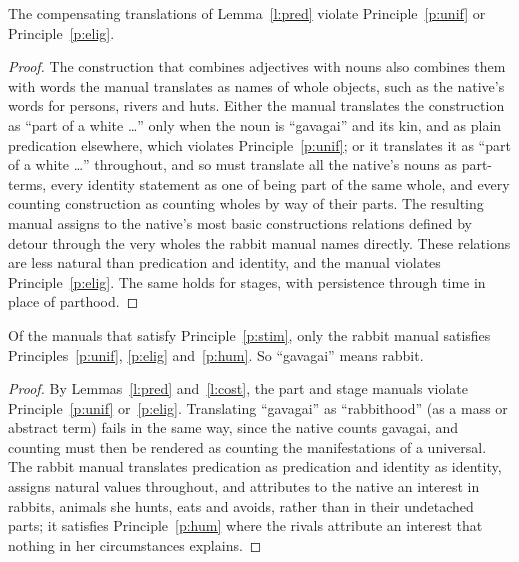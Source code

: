 \documentclass{situationist-preprint}
\begin{document}
\begin{lemma}[Cost]\label{l:cost}
The compensating translations of Lemma~\ref{l:pred} violate Principle~\ref{p:unif} or Principle~\ref{p:elig}.
\end{lemma}

\begin{proof}
The construction that combines adjectives with nouns also combines them with words the manual translates as names of whole objects, such as the native's words for persons, rivers and huts. Either the manual translates the construction as \enquote{part of a white \ldots} only when the noun is \enquote{gavagai} and its kin, and as plain predication elsewhere, which violates Principle~\ref{p:unif}; or it translates it as \enquote{part of a white \ldots} throughout, and so must translate all the native's nouns as part-terms, every identity statement as one of being part of the same whole, and every counting construction as counting wholes by way of their parts. The resulting manual assigns to the native's most basic constructions relations defined by detour through the very wholes the rabbit manual names directly. These relations are less natural than predication and identity, and the manual violates Principle~\ref{p:elig}. The same holds for stages, with persistence through time in place of parthood.
\end{proof}

\begin{theorem}\label{t:main}
Of the manuals that satisfy Principle~\ref{p:stim}, only the rabbit manual satisfies Principles~\ref{p:unif}, \ref{p:elig} and~\ref{p:hum}. So \enquote{gavagai} means rabbit.
\end{theorem}

\begin{proof}
By Lemmas~\ref{l:pred} and~\ref{l:cost}, the part and stage manuals violate Principle~\ref{p:unif} or~\ref{p:elig}. Translating \enquote{gavagai} as \enquote{rabbithood} (as a mass or abstract term) fails in the same way, since the native counts gavagai, and counting must then be rendered as counting the manifestations of a universal. The rabbit manual translates predication as predication and identity as identity, assigns natural values throughout, and attributes to the native an interest in rabbits, animals she hunts, eats and avoids, rather than in their undetached parts; it satisfies Principle~\ref{p:hum} where the rivals attribute an interest that nothing in her circumstances explains.
\end{proof}
\end{document}
